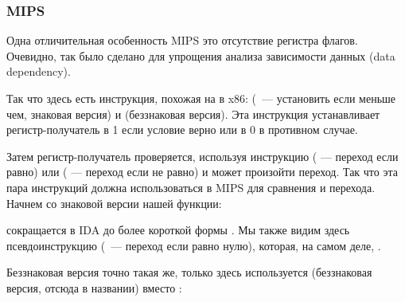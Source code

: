 ﻿\subsubsection{MIPS}

Одна отличительная особенность MIPS это отсутствие регистра флагов.
Очевидно, так было сделано для упрощения анализа зависимости данных (data dependency).

Так что здесь есть инструкция, похожая на  в x86:  (~--- установить если
меньше чем, знаковая версия) и  (беззнаковая версия).
Эта инструкция устанавливает регистр-получатель в 1 если условие верно или в 0 в противном случае.

Затем регистр-получатель проверяется, используя инструкцию 
 ( --- переход если равно) или  ( --- переход если не равно) 
и может произойти переход.
Так что эта пара инструкций должна использоваться в MIPS для сравнения и перехода.
Начнем со знаковой версии нашей функции:



 сокращается в IDA до более короткой формы .
Мы также видим здесь псевдоинструкцию  (~--- переход если равно нулю), 
которая, на самом деле, .

Беззнаковая версия точно такая же, только здесь используется  (беззнаковая версия, 
отсюда  в названии) вместо :



